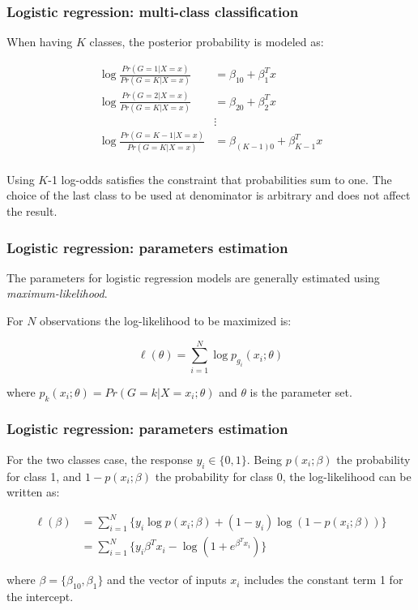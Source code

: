 \documentclass[notes]{beamer}          %
\begin{document}
\begin{frame}
\frametitle{Logistic regression: multi-class classification}

When having $K$ classes, the posterior probability is modeled as:

\begin{align*}
\log \frac{Pr(G=1 | X=x)}{Pr(G=K | X=x)} &= \beta_{10} + \beta_1^T x \\
\log \frac{Pr(G=2 | X=x)}{Pr(G=K | X=x)} &= \beta_{20} + \beta_2^T x \\
 & \vdots \\
\log \frac{Pr(G=K-1 | X=x)}{Pr(G=K | X=x)} &= \beta_{(K-1)0} + \beta_{K-1}^T x \\
\end{align*}

Using $K$-1 log-odds satisfies the constraint that probabilities sum to one. The choice of the last class to be used at denominator is arbitrary and does not affect the result.

\end{frame}



\begin{frame}
\frametitle{Logistic regression: parameters estimation}

The parameters for logistic regression models are generally estimated using \textit{maximum-likelihood}.

\vspace{5mm} 

\vspace{5mm} 

For $N$ observations the log-likelihood to be maximized is:

\begin{equation*}
    \ell(\theta) = \sum_{i=1}^N \log p_{g_i}(x_i; \theta)
\end{equation*}

where $p_k(x_i; \theta) = Pr(G=k|X=x_i; \theta)$ and $\theta$ is the parameter set.


\end{frame}

\begin{frame}
\frametitle{Logistic regression: parameters estimation}

For the two classes case, the response $y_i \in \{0,1\}$. Being $p(x_i;\beta)$ the probability for class 1, and $1-p(x_i;\beta)$ the probability for class 0, the log-likelihood can be written as:

\begin{align*}
    \ell(\beta) &= \sum_{i=1}^N \{ y_i \log p(x_i;\beta) + (1-y_i) \log (1-p(x_i;\beta)) \} \\
    &= \sum_{i=1}^N \{ y_i \beta^T x_i - \log (1+e^{\beta^T x_i}) \}
\end{align*}

where $\beta=\{ \beta_{10}, \beta_1\}$ and the vector of inputs $x_i$ includes the constant term 1 for the intercept.


\end{frame}
\end{document}
